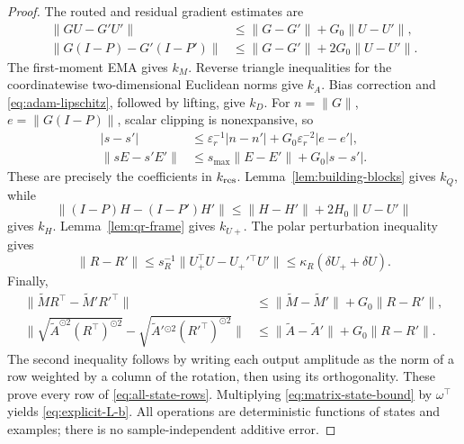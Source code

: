 \begin{proof}
The routed and residual gradient estimates are
\begin{align}
 \|GU-G'U'\|&\le\|G-G'\|+G_0\|U-U'\|,\\
 \|G(I-P)-G'(I-P')\|
 &\le\|G-G'\|+2G_0\|U-U'\|.
\end{align}
The first-moment EMA gives $k_M$. Reverse triangle inequalities for the
coordinatewise two-dimensional Euclidean norms give $k_A$. Bias correction
and \eqref{eq:adam-lipschitz}, followed by lifting, give $k_D$.
For $n=\|G\|$, $e=\|G(I-P)\|$, scalar clipping is nonexpansive, so
\begin{align}
 |s-s'|&\le\varepsilon_r^{-1}|n-n'|
                        +G_0\varepsilon_r^{-2}|e-e'|,\\
 \|sE-s'E'\|&\le s_{\max}\|E-E'\|+G_0|s-s'|.
\end{align}
These are precisely the coefficients in $k_{\rm res}$.
Lemma~\ref{lem:building-blocks} gives $k_Q$, while
\begin{equation}
 \|(I-P)H-(I-P')H'\|\le\|H-H'\|+2H_0\|U-U'\|
\end{equation}
gives $k_H$. Lemma~\ref{lem:qr-frame} gives $k_{U+}$.
The polar perturbation inequality gives
\begin{equation}
 \|R-R'\|\le s_R^{-1}
 \|U_+^\top U-U_+'{}^\top U'\|
 \le\kappa_R(\delta U_++\delta U).
\end{equation}
Finally,
\begin{align}
 \|\widetilde MR^\top-\widetilde M'R'^\top\|
 &\le\|\widetilde M-\widetilde M'\|+G_0\|R-R'\|,\\
 \|\sqrt{\widetilde A^{\odot2}(R^\top)^{\odot2}}
       -\sqrt{\widetilde A'{}^{\odot2}(R'^\top)^{\odot2}}\|
 &\le\|\widetilde A-\widetilde A'\|+G_0\|R-R'\|.
\end{align}
The second inequality follows by writing each output amplitude as the norm
of a row weighted by a column of the rotation, then using its orthogonality.
These prove every row of \eqref{eq:all-state-rows}. Multiplying
\eqref{eq:matrix-state-bound} by $\omega^\top$ yields
\eqref{eq:explicit-L-b}. All operations are deterministic functions of
states and examples; there is no sample-independent additive error.
\end{proof}

